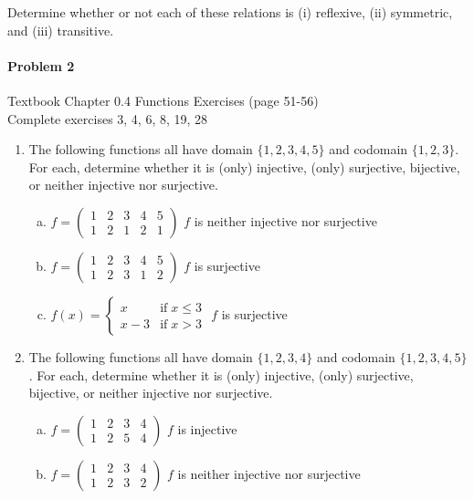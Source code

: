 \documentclass[11pt, a4paper]{article}
\newcommand\setItemNumber[1]{\setcounter{enumi}{\numexpr#1-1\relax}}
\begin{document}
		Determine whether or not each of these relations is (i) reflexive, (ii) symmetric, and (iii) transitive.	

	\paragraph{Problem 2} Textbook Chapter 0.4 Functions Exercises (page 51-56)\\
	Complete exercises 3, 4, 6, 8, 19, 28
		
    \begin{enumerate}

        \setItemNumber{3}
        \item The following functions all have domain $\{1,2,3,4,5\}$ and codomain $\{1,2,3\}$. For each, determine whether it is (only) injective, (only) surjective, bijective, or neither injective nor surjective.
            \begin{enumerate}[(a)]
                \item $ f = \begin{pmatrix} 1 & 2 & 3 & 4 & 5 \\ 1 & 2 & 1 & 2 & 1 \end{pmatrix} $ $f$ is neither injective nor surjective

                \item $ f = \begin{pmatrix} 1 & 2 & 3 & 4 & 5 \\ 1 & 2 & 3 & 1 & 2 \end{pmatrix} $ $f$ is surjective

                \item $ f(x) = \begin{cases} x & \text{if}\; x\leq 3\\ x - 3 & \text{if}\; x > 3\end{cases}$ $f$ is surjective
            \end{enumerate}


        \setItemNumber{4}
        \item The following functions all have domain $\{1,2,3,4\}$ and codomain $\{1,2,3,4,5\}$. For each, determine whether it is (only) injective, (only) surjective, bijective, or neither injective nor surjective.
            \begin{enumerate}[(a)]
                \item $ f = \begin{pmatrix} 1 & 2 & 3 & 4  \\ 1 & 2 & 5 & 4 \end{pmatrix}$ $f$ is injective 
                \item $ f = \begin{pmatrix} 1 & 2 & 3 & 4 \\ 1 & 2 & 3 & 2\end{pmatrix}$ $f$ is neither injective nor surjective


\end{enumerate}
\end{enumerate}
\end{document}
